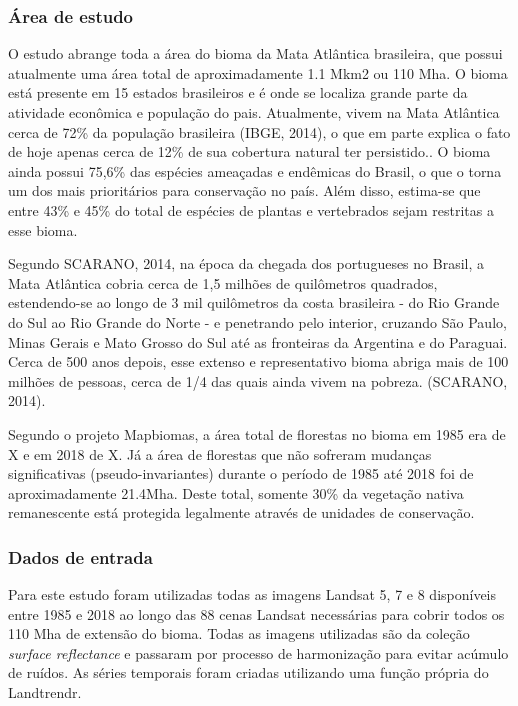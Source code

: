 \documentclass[12pt,a4paper]{article}
\begin{document}
\subsubsection{Área de estudo}
O estudo abrange toda a área do bioma da Mata Atlântica brasileira, que possui atualmente uma área total de aproximadamente 1.1 Mkm2 ou 110 Mha. O bioma está presente em 15 estados brasileiros e é onde se localiza grande parte da atividade econômica e população do pais. Atualmente, vivem na Mata Atlântica cerca de 72\% da população brasileira (IBGE, 2014), o que em parte explica o fato de hoje apenas cerca de 12\% de sua cobertura natural ter persistido.. O bioma ainda possui 75,6\% das espécies ameaçadas e endêmicas do Brasil, o que o torna um dos mais prioritários para conservação no país. Além disso, estima-se que entre 43\% e 45\% do total de espécies de plantas e vertebrados sejam restritas a esse bioma.

Segundo SCARANO, 2014, na época da chegada dos portugueses no Brasil, a Mata Atlântica cobria cerca de 1,5 milhões de quilômetros quadrados, estendendo-se ao longo de 3 mil quilômetros da costa brasileira - do Rio Grande do Sul ao Rio Grande do Norte - e penetrando pelo interior, cruzando São Paulo, Minas Gerais e Mato Grosso do Sul até as fronteiras da Argentina e do Paraguai. Cerca de 500 anos depois, esse extenso e representativo bioma abriga mais de 100 milhões de pessoas, cerca de 1/4 das quais ainda vivem na pobreza. (SCARANO, 2014).

Segundo o projeto Mapbiomas, a área total de florestas no bioma em 1985 era de X e em 2018 de X. Já a área de florestas que não sofreram mudanças significativas (pseudo-invariantes) durante o período de 1985 até 2018 foi de aproximadamente 21.4Mha. Deste total, somente  30\% da vegetação nativa remanescente está protegida legalmente através de unidades de conservação.


\subsubsection{Dados de entrada}
Para este estudo foram utilizadas todas as imagens Landsat 5, 7 e 8 disponíveis entre 1985 e 2018 ao longo das 88 cenas Landsat necessárias para cobrir todos os 110 Mha de extensão do bioma. Todas as imagens utilizadas são da coleção \emph{surface reflectance} e passaram por processo de harmonização para evitar acúmulo de ruídos. As séries temporais foram criadas utilizando uma função própria do Landtrendr.
\end{document}
